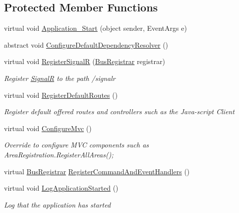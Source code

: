 \subsection*{Protected Member Functions}
\begin{DoxyCompactItemize}
\item 
virtual void \hyperlink{classCqrs_1_1WebApi_1_1CqrsHttpApplication_a234e82de913e082edc4a90207d901e2a}{Application\+\_\+\+Start} (object sender, Event\+Args e)
\item 
abstract void \hyperlink{classCqrs_1_1WebApi_1_1CqrsHttpApplication_a8dc48dbd1e33323c2d163f0e4719b845}{Configure\+Default\+Dependency\+Resolver} ()
\item 
virtual void \hyperlink{classCqrs_1_1WebApi_1_1CqrsHttpApplication_ad47fbc81b57345f9998345a2e270da5c}{Register\+SignalR} (\hyperlink{classCqrs_1_1Configuration_1_1BusRegistrar}{Bus\+Registrar} registrar)
\begin{DoxyCompactList}\small\item\em Register \hyperlink{namespaceCqrs_1_1WebApi_1_1SignalR}{SignalR} to the path /signalr \end{DoxyCompactList}\item 
virtual void \hyperlink{classCqrs_1_1WebApi_1_1CqrsHttpApplication_afaeb2e7a6c5e3e65ef1ff23ae6224070}{Register\+Default\+Routes} ()
\begin{DoxyCompactList}\small\item\em Register default offered routes and controllers such as the Java-\/script Client \end{DoxyCompactList}\item 
virtual void \hyperlink{classCqrs_1_1WebApi_1_1CqrsHttpApplication_ab8b7cc0d6638a3a29f20c2186b08ca77}{Configure\+Mvc} ()
\begin{DoxyCompactList}\small\item\em Override to configure M\+VC components such as Area\+Registration.\+Register\+All\+Areas(); \end{DoxyCompactList}\item 
virtual \hyperlink{classCqrs_1_1Configuration_1_1BusRegistrar}{Bus\+Registrar} \hyperlink{classCqrs_1_1WebApi_1_1CqrsHttpApplication_a47a242f0cb58976b13dc2d0dbe1cd89f}{Register\+Command\+And\+Event\+Handlers} ()
\item 
virtual void \hyperlink{classCqrs_1_1WebApi_1_1CqrsHttpApplication_a92e8ee7fef861d2eeec741b0f46b9d1f}{Log\+Application\+Started} ()
\begin{DoxyCompactList}\small\item\em Log that the application has started \end{DoxyCompactList}\item 

\end{DoxyCompactItemize}
